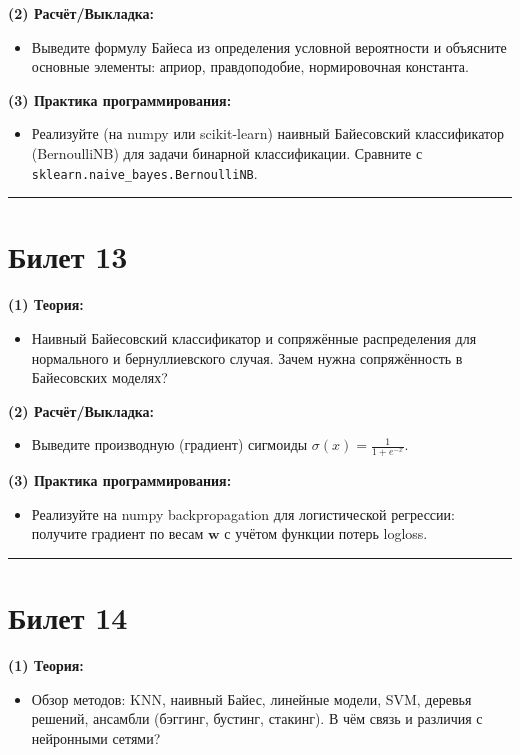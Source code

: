 \documentclass[a4paper,12pt]{article}
\begin{document}
\textbf{(2) Расчёт/Выкладка:}
\begin{itemize}
  \item Выведите формулу Байеса из определения условной вероятности и объясните основные элементы: априор, правдоподобие, нормировочная константа.
\end{itemize}

\textbf{(3) Практика программирования:}
\begin{itemize}
  \item Реализуйте (на numpy или scikit-learn) наивный Байесовский классификатор (BernoulliNB) для задачи бинарной классификации. Сравните с \texttt{sklearn.naive\_bayes.BernoulliNB}.
\end{itemize}

\noindent\rule{\textwidth}{0.4pt}
\newpage

\section*{Билет 13}
\textbf{(1) Теория:}
\begin{itemize}
  \item Наивный Байесовский классификатор и сопряжённые распределения для нормального и бернуллиевского случая. Зачем нужна сопряжённость в Байесовских моделях?
\end{itemize}

\textbf{(2) Расчёт/Выкладка:}
\begin{itemize}
  \item Выведите производную (градиент) сигмоиды $\sigma(x) = \frac{1}{1 + e^{-x}}$.
\end{itemize}

\textbf{(3) Практика программирования:}
\begin{itemize}
  \item Реализуйте на numpy backpropagation для логистической регрессии: получите градиент по весам $\mathbf{w}$ с учётом функции потерь logloss.
\end{itemize}

\noindent\rule{\textwidth}{0.4pt}

\section*{Билет 14}
\textbf{(1) Теория:}
\begin{itemize}
  \item Обзор методов: KNN, наивный Байес, линейные модели, SVM, деревья решений, ансамбли (бэггинг, бустинг, стакинг). В чём связь и различия с нейронными сетями?
\end{itemize}
\end{document}
